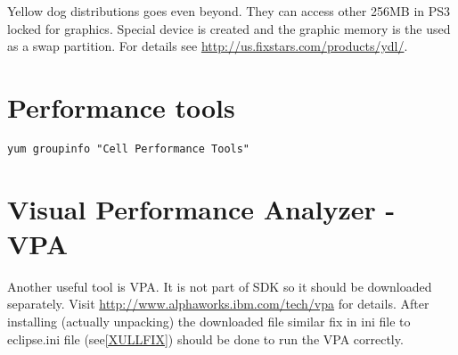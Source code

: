 Yellow dog distributions goes even beyond. They can access other 256MB in PS3 locked for graphics.
Special device is created and the graphic memory is the used as a swap partition. For details see \url{http://us.fixstars.com/products/ydl/}.

\section{Performance tools}

\begin{verbatim}
yum groupinfo "Cell Performance Tools"
\end{verbatim}

\section{Visual Performance Analyzer - VPA}

Another useful tool is VPA. It is not part of SDK so it should be downloaded separately.
Visit \url{http://www.alphaworks.ibm.com/tech/vpa} for details.
After installing (actually unpacking) the downloaded file similar fix in ini file to eclipse.ini file (see\ref{XULLFIX}) should be done to run the VPA correctly.